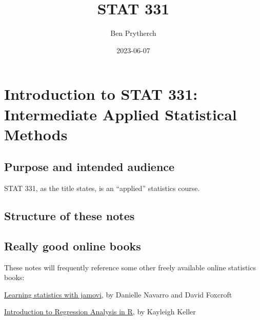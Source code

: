 \documentclass[
  letterpaper,
  DIV=11,
  numbers=noendperiod]{scrreprt}
\title{STAT 331}
\author{Ben Prytherch}
\date{2023-06-07}
\renewcommand*\contentsname{Table of contents}
\newcommand\contentsname{Table of contents}
\begin{document}
\maketitle
\ifdefined\Shaded\renewenvironment{Shaded}{\begin{tcolorbox}[boxrule=0pt, frame hidden, interior hidden, breakable, borderline west={3pt}{0pt}{shadecolor}, sharp corners, enhanced]}{\end{tcolorbox}}\fi

\renewcommand*\contentsname{Table of contents}
{
\hypersetup{linkcolor=}
\setcounter{tocdepth}{2}
\tableofcontents
}

\hypertarget{introduction-to-stat-331-intermediate-applied-statistical-methods}{%
\chapter{Introduction to STAT 331: Intermediate Applied Statistical
Methods}\label{introduction-to-stat-331-intermediate-applied-statistical-methods}}

\hypertarget{purpose-and-intended-audience}{%
\section{Purpose and intended
audience}\label{purpose-and-intended-audience}}

STAT 331, as the title states, is an ``applied'' statistics course.

\hypertarget{structure-of-these-notes}{%
\section{Structure of these notes}\label{structure-of-these-notes}}

\hypertarget{really-good-online-books}{%
\section{Really good online books}\label{really-good-online-books}}

These notes will frequently reference some other freely available online
statistics books:

\href{https://www.learnstatswithjamovi.com/}{Learning statistics with
jamovi}, by Danielle Navarro and David Foxcroft

\href{https://www.kellerbiostat.com/introregression/}{Introduction to
Regression Analysis in R}, by Kayleigh Keller
\end{document}
